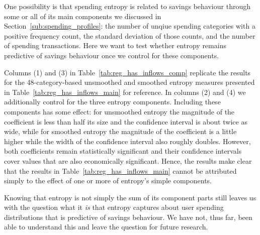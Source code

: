 One possibility is that spending entropy is related to savings behaviour
through some or all of its main components we discussed in
Section~\ref{sub:spending_profiles}: the number of unqiue spending categories
with a positive frequency count, the standard deviation of those counts, and
the number of spending transactions. Here we want to test whether entropy
remains predictive of savings behaviour once we control for these components.



Columns (1) and (3) in Table~\ref{tab:reg_has_inflows_comp} replicate the
results for the 48-category-based unsmoothed and smoothed entropy measures
presented in Table~\ref{tab:reg_has_inflows_main} for reference. In columns (2)
and (4) we additionally control for the three entropy components. Including
these components has some effect: for unsmoothed entropy the magnitude of the
coefficient is less than half its size and the confidence interval is about
twice as wide, while for smoothed entropy the magnitude of the coefficient is a
little higher while the width of the confidence interval also roughly doubles.
However, both coefficients remain statistically significant and their
confidence intervals cover values that are also economically significant.
Hence, the results make clear that the results in
Table~\ref{tab:reg_has_inflows_main} cannot be attributed simply to the effect
of one or more of entropy's simple components.

Knowing that entropy is not simply the sum of its component parts still leaves
us with the question what it \textit{is} that entropy captures about user
spending distributions that is predictive of savings behaviour. We have not,
thus far, been able to understand this and leave the question for future
research.



